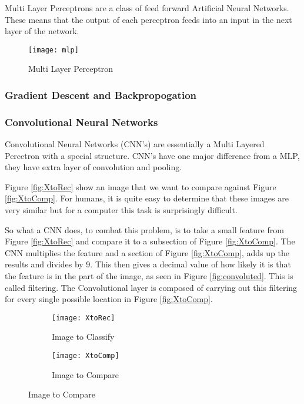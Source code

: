 Multi Layer Perceptrons are a class of feed forward Artificial Neural Networks.
These means that the output of each perceptron feeds into an input in the next
layer of the network.

\begin{figure}
    \texttt{[image: mlp]}
     \caption{Multi Layer Perceptron}
     \label{fig:mlp}
\end{figure}

\subsubsection{Gradient Descent and Backpropogation}

\subsubsection{Convolutional Neural Networks}
Convolutional Neural Networks (CNN's) are essentially a Multi Layered Percetron with a
special structure. CNN's have one major difference from a MLP, they have extra
layer of convolution and pooling.

Figure \ref{fig:XtoRec} show an image that we want to compare against
Figure \ref{fig:XtoComp}.
For humans, it is quite easy to determine that these images are very similar but
for a computer this task is surprisingly difficult.

So what a CNN does, to combat this problem, is to take a small feature from
Figure \ref{fig:XtoRec} and compare it to a subsection of Figure \ref{fig:XtoComp}.
The CNN multiplies the feature and a section of Figure \ref{fig:XtoComp}, adds
up the results and divides by 9. This then gives a decimal value of how likely
it is that the feature is in the part of the image, as seen in Figure
\ref{fig:convoluted}.
This is called filtering. The Convolutional layer is composed of carrying out
this filtering for every single possible location in Figure \ref{fig:XtoComp}.
\begin{figure}
      \begin{subfigure}[b]{0.4\textwidth}
          \texttt{[image: XtoRec]}
          \caption{Image to Classify}
          \label{XtoRec}
      \end{subfigure}
      \begin{subfigure}[b]{0.4\textwidth}
      \texttt{[image: XtoComp]}
      \caption{Image to Compare}
      \label{XtoComp}
      \end{subfigure}
\end{figure}

